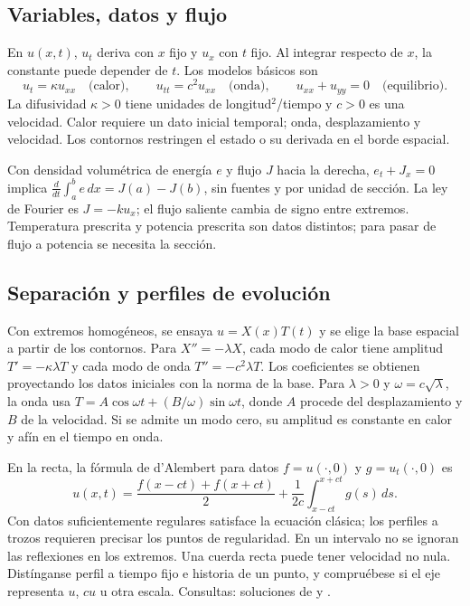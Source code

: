 %
\subsection*{Variables, datos y flujo}
\label{CH10-B01}
En $u(x,t)$, $u_t$ deriva con $x$ fijo y $u_x$ con $t$ fijo. Al integrar
respecto de $x$, la constante puede depender de $t$. Los modelos básicos
son
\[
 u_t=\kappa u_{xx}\quad\text{(calor)},\qquad
 u_{tt}=c^2u_{xx}\quad\text{(onda)},\qquad
 u_{xx}+u_{yy}=0\quad\text{(equilibrio)}.
\]
La difusividad $\kappa>0$ tiene unidades de longitud$^2$/tiempo y
$c>0$ es una velocidad. Calor requiere un dato inicial temporal; onda,
desplazamiento y velocidad. Los contornos restringen el estado o su
derivada en el borde espacial.

Con densidad volumétrica de energía $e$ y flujo $J$ hacia la derecha,
$e_t+J_x=0$ implica
$\frac{d}{dt}\int_a^b e\,dx=J(a)-J(b)$, sin fuentes y por unidad de
sección. La ley de Fourier es $J=-k u_x$; el flujo saliente cambia de
signo entre extremos. Temperatura prescrita y potencia prescrita son
datos distintos; para pasar de flujo a potencia se necesita la sección.

%
\subsection*{Separación y perfiles de evolución}
\label{CH10-B02}
Con extremos homogéneos, se ensaya $u=X(x)T(t)$ y se elige la base
espacial a partir de los contornos. Para $X''=-\lambda X$, cada modo
de calor tiene amplitud $T'= -\kappa\lambda T$ y cada modo de onda
$T''=-c^2\lambda T$. Los coeficientes se obtienen proyectando los datos
iniciales con la norma de la base. Para $\lambda>0$ y
$\omega=c\sqrt\lambda$, la onda usa
$T=A\cos\omega t+(B/\omega)\sin\omega t$, donde $A$ procede del
desplazamiento y $B$ de la velocidad. Si se admite un modo cero,
su amplitud es constante en calor y afín en el tiempo en onda.

En la recta, la fórmula de d'Alembert para datos $f=u(\cdot,0)$ y
$g=u_t(\cdot,0)$ es
\[
 u(x,t)=\frac{f(x-ct)+f(x+ct)}2
       +\frac1{2c}\int_{x-ct}^{x+ct}g(s)\,ds.
\]
Con datos suficientemente regulares satisface la ecuación clásica; los
perfiles a trozos requieren precisar los puntos de regularidad.
En un intervalo no se ignoran las reflexiones en los extremos.
Una cuerda recta puede tener velocidad no nula. Distínganse perfil a
tiempo fijo e historia de un punto, y compruébese si el eje representa
$u$, $cu$ u otra escala. Consultas: soluciones de  y
.

